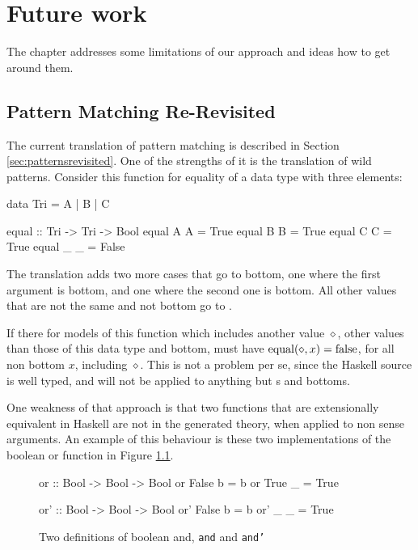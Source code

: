 \chapter{Future work}
\label{ch:future}

The chapter addresses some limitations of our approach and ideas how
to get around them.

\section{Pattern Matching Re-Revisited}
\label{sec:rerevisited}

The current translation of pattern matching is described in Section
\ref{sec:patternsrevisited}. One of the strengths of it is the
translation of wild patterns. Consider this function for equality of a
data type with three elements:

\begin{code}
data Tri = A | B | C

equal :: Tri -> Tri -> Bool
equal A A = True
equal B B = True
equal C C = True
equal _ _ = False
\end{code}

\noindent
The translation adds two more cases that go to bottom, one where the
first argument is bottom, and one where the second one is bottom. All
other values that are not the same  and not bottom go to
.

If there for models of this function which includes
another value $\diamond$, other values than those of this data type and
bottom, must have $\mathrm{equal}(\diamond,x) = \mathrm{false}$, for all non
bottom $x$, including $\diamond$. This is not a problem per se, since the
Haskell source is well typed, and  will not be applied to
anything but s and bottoms.

One weakness of that approach is that two functions that are
extensionally equivalent in Haskell are not in the generated theory,
when applied to non sense arguments. An example of this behaviour is
these two implementations of the boolean or function in Figure
\ref{code:or}.

\begin{figure}[h!]
\centering
\begin{minipage}[b]{6cm}
\begin{code}
or :: Bool -> Bool -> Bool
or False b = b
or True  _ = True
\end{code}
\end{minipage}
\hspace{10pt}
\begin{minipage}[b]{6cm}
\begin{code}
or' :: Bool -> Bool -> Bool
or' False b = b
or' _     _ = True
\end{code}
\end{minipage}
\caption{Two definitions of boolean and, \texttt{and} and \texttt{and'}
\label{code:or}
}
\end{figure}

